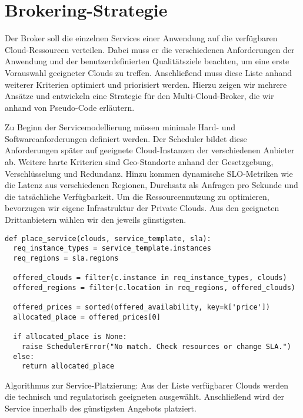 \section{Brokering-Strategie}
\label{sec:brokering}

Der Broker soll die einzelnen Services einer Anwendung auf die verfügbaren Cloud-Ressourcen verteilen. Dabei muss er die verschiedenen Anforderungen der Anwendung und der benutzerdefinierten Qualitätsziele beachten, um eine erste Vorauswahl geeigneter Clouds zu treffen. Anschließend muss diese Liste anhand weiterer Kriterien optimiert und priorisiert werden. Hierzu zeigen wir mehrere Ansätze und entwickeln eine Strategie für den Multi-Cloud-Broker, die wir anhand von Pseudo-Code erläutern.

Zu Beginn der Servicemodellierung müssen minimale Hard- und Softwareanforderungen definiert werden. Der Scheduler bildet diese Anforderungen später auf geeignete Cloud-Instanzen der verschiedenen Anbieter ab. Weitere harte Kriterien sind Geo-Standorte anhand der Gesetzgebung, Verschlüsselung und Redundanz. Hinzu kommen dynamische SLO-Metriken wie die Latenz aus verschiedenen Regionen, Durchsatz als Anfragen pro Sekunde und die tatsächliche Verfügbarkeit. Um die Ressourcennutzung zu optimieren, bevorzugen wir eigene Infrastruktur der Private Clouds. Aus den geeigneten Drittanbietern wählen wir den jeweils günstigsten.

\begin{listing}[ht]
\begin{verbatim}
def place_service(clouds, service_template, sla):
  req_instance_types = service_template.instances
  req_regions = sla.regions
	
  offered_clouds = filter(c.instance in req_instance_types, clouds)
  offered_regions = filter(c.location in req_regions, offered_clouds)
	
  offered_prices = sorted(offered_availability, key=k['price'])
  allocated_place = offered_prices[0]
	
  if allocated_place is None:
    raise SchedulerError("No match. Check resources or change SLA.")
  else:
    return allocated_place
\end{verbatim}
\caption{Algorithmus zur Service-Platzierung: Aus der Liste verfügbarer Clouds werden die technisch und regulatorisch geeigneten ausgewählt. Anschließend wird der Service innerhalb des günstigsten Angebots platziert.}
\label{listing:placing}
\end{listing}

